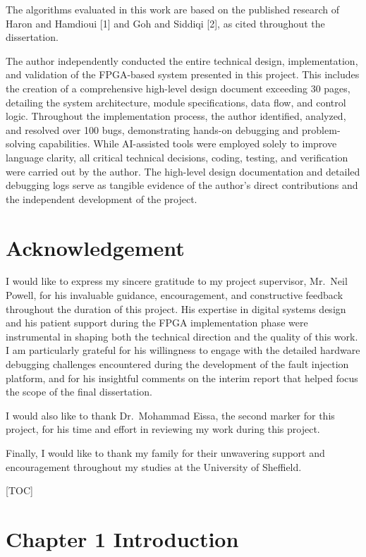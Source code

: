 \documentclass[
  12pt,
  a4paper]{report}
\begin{document}
The algorithms evaluated in this work are based on the published
research of Haron and Hamdioui {[}1{]} and Goh and Siddiqi {[}2{]}, as
cited throughout the dissertation.

The author independently conducted the entire technical design,
implementation, and validation of the FPGA-based system presented in
this project. This includes the creation of a comprehensive high-level
design document exceeding 30 pages, detailing the system architecture,
module specifications, data flow, and control logic. Throughout the
implementation process, the author identified, analyzed, and resolved
over 100 bugs, demonstrating hands-on debugging and problem-solving
capabilities. While AI-assisted tools were employed solely to improve
language clarity, all critical technical decisions, coding, testing, and
verification were carried out by the author. The high-level design
documentation and detailed debugging logs serve as tangible evidence of
the author's direct contributions and the independent development of the
project.

\chapter{Acknowledgement}\label{acknowledgement}

I would like to express my sincere gratitude to my project supervisor,
Mr.~Neil Powell, for his invaluable guidance, encouragement, and
constructive feedback throughout the duration of this project. His
expertise in digital systems design and his patient support during the
FPGA implementation phase were instrumental in shaping both the
technical direction and the quality of this work. I am particularly
grateful for his willingness to engage with the detailed hardware
debugging challenges encountered during the development of the fault
injection platform, and for his insightful comments on the interim
report that helped focus the scope of the final dissertation.

I would also like to thank Dr.~Mohammad Eissa, the second marker for
this project, for his time and effort in reviewing my work during this
project.

Finally, I would like to thank my family for their unwavering support
and encouragement throughout my studies at the University of Sheffield.

{[}TOC{]}

\chapter{Chapter 1 Introduction}\label{chapter-1-introduction}
\end{document}
